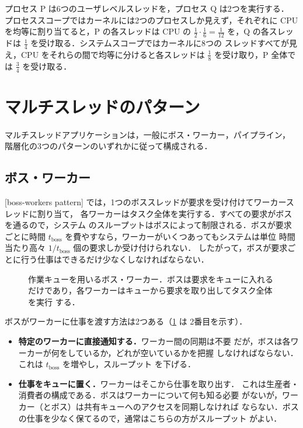 \documentclass[../main.tex]{subfiles}
\begin{document}
\begin{example}
  プロセス P は6つのユーザレベルスレッドを，プロセス Q は2つを実行する．
  プロセススコープではカーネルには2つのプロセスしか見えず，それぞれに
  CPU を均等に割り当てると，P の各スレッドは CPU の
  $\frac{1}{2}\cdot\frac{1}{6} = \frac{1}{12}$ を，Q の各スレッドは
  $\frac{1}{4}$ を受け取る．システムスコープではカーネルに8つの
  スレッドすべてが見え，CPU をそれらの間で均等に分けると各スレッドは
  $\frac{1}{8}$ を受け取り，P 全体では $\frac{3}{4}$ を受け取る．
\end{example}

\section{マルチスレッドのパターン}
\label{sec:l03-patterns}

マルチスレッドアプリケーションは，一般にボス・ワーカー，パイプライン，
階層化の3つのパターンのいずれかに従って構成される．

\subsection{ボス・ワーカー}

[boss-workers pattern]%
では，1つのボススレッドが要求を受け付けてワーカースレッドに割り当て，
各ワーカーはタスク全体を実行する．すべての要求がボスを通るので，システム
のスループットはボスによって制限される．ボスが要求ごとに時間
$t_{\mathrm{boss}}$ を費やすなら，ワーカーがいくつあってもシステムは単位
時間当たり高々 $1/t_{\mathrm{boss}}$ 個の要求しか受け付けられない．
したがって，ボスが要求ごとに行う仕事はできるだけ少なくしなければならない．

\begin{figure}[htbp]
  \centering
  
  \caption{作業キューを用いるボス・ワーカー．ボスは要求をキューに入れる
    だけであり，各ワーカーはキューから要求を取り出してタスク全体を実行
    する．}
  \label{fig:l03-boss-workers}
\end{figure}

ボスがワーカーに仕事を渡す方法は2つある（\cref{fig:l03-boss-workers} は
2番目を示す）．
\begin{itemize}
  \item \textbf{特定のワーカーに直接通知する．}ワーカー間の同期は不要
    だが，ボスは各ワーカーが何をしているか，どれが空いているかを把握
    しなければならない．これは $t_{\mathrm{boss}}$ を増やし，スループット
    を下げる．
  \item \textbf{仕事をキューに置く．}ワーカーはそこから仕事を取り出す．
    これは生産者・消費者の構成である．ボスはワーカーについて何も知る必要
    がないが，ワーカー（とボス）は共有キューへのアクセスを同期しなければ
    ならない．ボスの仕事を少なく保てるので，通常はこちらの方がスループット
    がよい．
\end{itemize}
\end{document}
